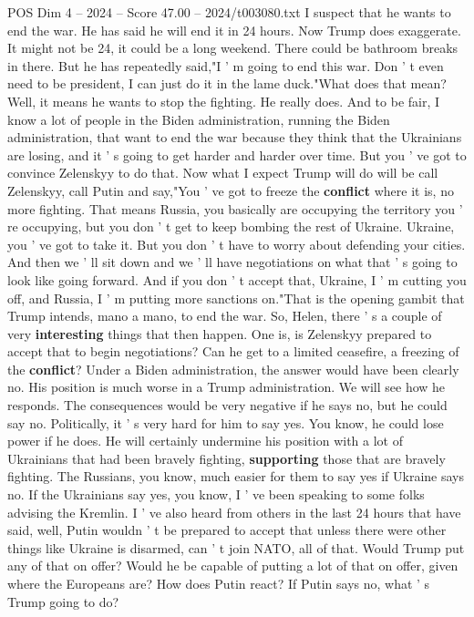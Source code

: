 \begin{textsample}{POS Dim 4 – 2024 – Score 47.00 – 2024/t003080.txt}
I suspect that he wants to end the war.
He has said he will end it in 24 hours.
Now Trump does exaggerate.
It might not be 24, it could be a long weekend.
There could be bathroom breaks in there.
But he has repeatedly said,"I ' m going to end this war.
Don ' t even need to be president, I can just do it in the lame duck."What does that mean?
Well, it means he wants to stop the fighting.
He really does.
And to be fair, I know a lot of people in the Biden administration, running the Biden administration, that want to end the war because they think that the Ukrainians are losing, and it ' s going to get harder and harder over time.
But you ' ve got to convince Zelenskyy to do that.
Now what I expect Trump will do will be call Zelenskyy, call Putin and say,"You ' ve got to freeze the \textbf{conflict} where it is, no more fighting.
That means Russia, you basically are occupying the territory you ' re occupying, but you don ' t get to keep bombing the rest of Ukraine.
Ukraine, you ' ve got to take it.
But you don ' t have to worry about defending your cities.
And then we ' ll sit down and we ' ll have negotiations on what that ' s going to look like going forward.
And if you don ' t accept that, Ukraine, I ' m cutting you off, and Russia, I ' m putting more sanctions on."That is the opening gambit that Trump intends, mano a mano, to end the war.
So, Helen, there ' s a couple of very \textbf{interesting} things that then happen.
One is, is Zelenskyy prepared to accept that to begin negotiations?
Can he get to a limited ceasefire, a freezing of the \textbf{conflict}?
Under a Biden administration, the answer would have been clearly no.
His position is much worse in a Trump administration.
We will see how he responds.
The consequences would be very negative if he says no, but he could say no.
Politically, it ' s very hard for him to say yes.
You know, he could lose power if he does.
He will certainly undermine his position with a lot of Ukrainians that had been bravely fighting, \textbf{supporting} those that are bravely fighting.
The Russians, you know, much easier for them to say yes if Ukraine says no.
If the Ukrainians say yes, you know, I ' ve been speaking to some folks advising the Kremlin.
I ' ve also heard from others in the last 24 hours that have said, well, Putin wouldn ' t be prepared to accept that unless there were other things like Ukraine is disarmed, can ' t join NATO, all of that.
Would Trump put any of that on offer?
Would he be capable of putting a lot of that on offer, given where the Europeans are?
How does Putin react?
If Putin says no, what ' s Trump going to do?

\end{textsample}
